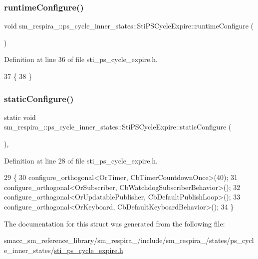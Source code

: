 \subsubsection{\texorpdfstring{runtime\+Configure()}{runtimeConfigure()}}
{\footnotesize\ttfamily void sm\+\_\+respira\+\_\+::ps\+\_\+cycle\+\_\+inner\+\_\+states\+::\+Sti\+P\+S\+Cycle\+Expire\+::runtime\+Configure (\begin{DoxyParamCaption}{ }\end{DoxyParamCaption})\hspace{0.3cm}{\ttfamily [inline]}}



Definition at line 36 of file sti\+\_\+ps\+\_\+cycle\+\_\+expire.\+h.


\begin{DoxyCode}
37   \{
38   \}
\end{DoxyCode}
\mbox{\label{structsm__respira__1_1_1ps__cycle__inner__states_1_1StiPSCycleExpire_ab76869554f2e9a2b0fcf782d53fcb798}} 
\subsubsection{\texorpdfstring{static\+Configure()}{staticConfigure()}}
{\footnotesize\ttfamily static void sm\+\_\+respira\+\_\+::ps\+\_\+cycle\+\_\+inner\+\_\+states\+::\+Sti\+P\+S\+Cycle\+Expire\+::static\+Configure (\begin{DoxyParamCaption}{ }\end{DoxyParamCaption})\hspace{0.3cm}{\ttfamily [inline]}, {\ttfamily [static]}}



Definition at line 28 of file sti\+\_\+ps\+\_\+cycle\+\_\+expire.\+h.


\begin{DoxyCode}
29   \{
30     configure\_orthogonal<OrTimer, CbTimerCountdownOnce>(40);
31     configure\_orthogonal<OrSubscriber, CbWatchdogSubscriberBehavior>();
32     configure\_orthogonal<OrUpdatablePublisher, CbDefaultPublishLoop>();
33     configure\_orthogonal<OrKeyboard, CbDefaultKeyboardBehavior>();
34   \}
\end{DoxyCode}


The documentation for this struct was generated from the following file\+:\begin{DoxyCompactItemize}
\item 
smacc\+\_\+sm\+\_\+reference\+\_\+library/sm\+\_\+respira\+\_/include/sm\+\_\+respira\+\_/states/ps\+\_\+cycle\+\_\+inner\+\_\+states/\hyperlink{sti__ps__cycle__expire_8h}{sti\+\_\+ps\+\_\+cycle\+\_\+expire.\+h}\end{DoxyCompactItemize}
